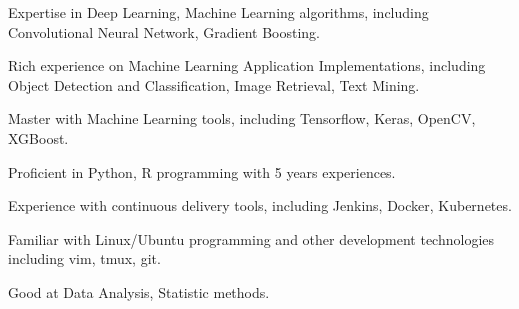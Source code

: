 

\begin{cvparagraph}
    
\end{cvparagraph}
\begin{cvparagraph}
    
\end{cvparagraph}

\begin{cvparagraph}
  \begin{cvitems}

    \item {Expertise in Deep Learning, Machine Learning algorithms, including Convolutional Neural Network, Gradient Boosting.}
    \item {Rich experience on Machine Learning Application Implementations, including Object Detection and Classification, Image Retrieval, Text Mining.}
    \item {Master with Machine Learning tools, including Tensorflow, Keras, OpenCV, XGBoost.}
    \item {Proficient in Python, R programming with 5 years experiences.}
    \item {Experience with continuous delivery tools, including Jenkins, Docker, Kubernetes.}
    \item {Familiar with Linux/Ubuntu programming and other development technologies including vim, tmux, git.}
    \item {Good at Data Analysis, Statistic methods.}
  \end{cvitems}
\end{cvparagraph}
